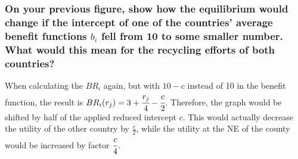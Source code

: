     \subsubsection{On your previous figure, show how the equilibrium would change if the intercept of one of the countries' average benefit functions $b_i$ fell from 10 to some smaller number. What would this mean for the recycling efforts of both countries?}
    When calculating the $BR_i$ again, but with $10-c$ instead of 10 in the benefit function, the result is
    $BR_i(r_j)=3+\cfrac{r_j}{4}-\cfrac{c}{2}$. Therefore, the graph would be shifted by half of the applied reduced intercept $c$.
    This would actually decrease the utility of the other country by $\frac{c}{2}$, while the utility at the NE of the county would be
    increased by factor $\cfrac{c}{4}$.

